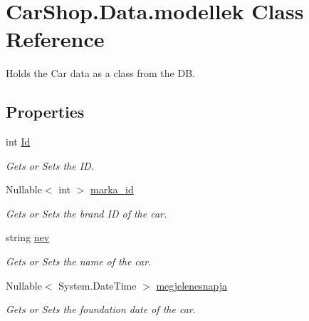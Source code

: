 \hypertarget{class_car_shop_1_1_data_1_1modellek}{}\section{Car\+Shop.\+Data.\+modellek Class Reference}
\label{class_car_shop_1_1_data_1_1modellek}


Holds the Car data as a class from the DB.  


\subsection*{Properties}
\begin{DoxyCompactItemize}
\item 
int \mbox{\hyperlink{class_car_shop_1_1_data_1_1modellek_a783e9d72353d859d209544c6dda336e7}{Id}}
\begin{DoxyCompactList}\small\item\em Gets or Sets the ID. \end{DoxyCompactList}\item 
Nullable$<$ int $>$ \mbox{\hyperlink{class_car_shop_1_1_data_1_1modellek_a8b55b0ee065570c4afe38b07f678c07d}{marka\+\_\+id}}
\begin{DoxyCompactList}\small\item\em Gets or Sets the brand ID of the car. \end{DoxyCompactList}\item 
string \mbox{\hyperlink{class_car_shop_1_1_data_1_1modellek_aa42b056978064ec5f4cf78c04561143d}{nev}}
\begin{DoxyCompactList}\small\item\em Gets or Sets the name of the car. \end{DoxyCompactList}\item 
Nullable$<$ System.\+Date\+Time $>$ \mbox{\hyperlink{class_car_shop_1_1_data_1_1modellek_a5cb4acf1238cc03a3658e56410d2eafb}{megjelenesnapja}}
\begin{DoxyCompactList}\small\item\em Gets or Sets the foundation date of the car. \end{DoxyCompactList}\item 

\end{DoxyCompactItemize}
